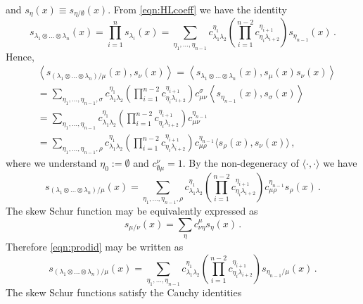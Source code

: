 \documentclass[main.tex]{subfiles}
\begin{document}
and $s_{\eta}(x)\equiv s_{\eta/\emptyset}(x)$. From \eqref{eqn:HLcoeff} we have the identity
\begin{equation}
s_{\lambda_1\otimes\dots\otimes\lambda_n}(x)=\prod_{i=1}^ns_{\lambda_i}(x)=\sum_{\eta_1,\dots,\eta_{n-1}}c_{\lambda_1\lambda_2}^{\eta_1}\left(\prod_{i=1}^{n-2}c_{\eta_i\lambda_{i+2}}^{\eta_{i+1}}\right)s_{\eta_{n-1}}(x)\,.
\end{equation}
Hence,
\begin{align}
&\left\langle s_{\left(\lambda_1\otimes\dots\otimes\lambda_n\right)/\mu}(x),s_{\nu}(x)\right\rangle=\left\langle s_{\lambda_1\otimes\dots\otimes\lambda_n}(x),s_{\mu}(x)s_{\nu}(x)\right\rangle\\
&=\sum_{\eta_1,\dots,\eta_{n-1},\sigma}c_{\lambda_1\lambda_2}^{\eta_1}\left(\prod_{i=1}^{n-2}c_{\eta_i\lambda_{i+2}}^{\eta_{i+1}}\right)c_{\mu\nu}^{\sigma}\left\langle s_{\eta_{n-1}}(x),s_{\sigma}(x)\right\rangle\\
&=\sum_{\eta_1,\dots,\eta_{n-1}}c_{\lambda_1\lambda_2}^{\eta_1}\left(\prod_{i=1}^{n-2}c_{\eta_i\lambda_{i+2}}^{\eta_{i+1}}\right)c_{\mu\nu}^{\eta_{n-1}}\\
&=\sum_{\eta_1,\dots,\eta_{n-1},\rho}c_{\lambda_1\lambda_2}^{\eta_1}\left(\prod_{i=1}^{n-2}c_{\eta_i\lambda_{i+2}}^{\eta_{i+1}}\right)c_{\mu\rho}^{\eta_{n-1}}\langle s_{\rho}(x),s_{\nu}(x)\rangle\,,
\end{align}
where we understand $\eta_{0}:=\emptyset$ and $c_{\emptyset\mu}^{\nu}=1$. By the non-degeneracy of $\langle\cdot,\cdot\rangle$ we have
\begin{equation}\label{eqn:prodid}
s_{\left(\lambda_1\otimes\dots\otimes\lambda_n\right)/\mu}(x)=\sum_{\eta_1,\dots,\eta_{n-1},\rho}c_{\lambda_1\lambda_2}^{\eta_1}\left(\prod_{i=1}^{n-2}c_{\eta_i\lambda_{i+2}}^{\eta_{i+1}}\right)c_{\mu\rho}^{\eta_{n-1}}s_{\rho}(x)\,.
\end{equation}
The skew Schur function may be equivalently expressed as
\begin{equation}\label{eqn:skewdef2}
s_{\mu/\nu}(x)=\sum_{\eta}c_{\nu\eta}^{\mu}s_{\eta}(x)\,.
\end{equation}
Therefore \eqref{eqn:prodid} may be written as
\begin{equation}\label{eqn:tensorprodid}
s_{\left(\lambda_1\otimes\dots\otimes\lambda_n\right)/\mu}(x)=\sum_{\eta_1,\dots,\eta_{n-1}}c_{\lambda_1\lambda_2}^{\eta_1}\left(\prod_{i=1}^{n-2}c_{\eta_i\lambda_{i+2}}^{\eta_{i+1}}\right)s_{\eta_{n-1}/\mu}(x)\,.
\end{equation}
The skew Schur functions satisfy the Cauchy identities
\end{document}
